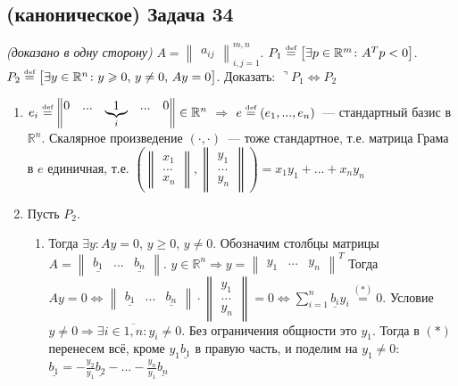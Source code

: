 \documentclass[a4paper]{article}
\def\eqdef{\overset{\mbox{\tiny def}}{=}}
\newcommand{\RR}{\mathbb{R}}
\begin{document}
\subsection*{(каноническое) Задача 34}
{\em (доказано в одну сторону)}\newline
$A=\begin{Vmatrix}
a_{ij}
\end{Vmatrix}_{i,j=1}^{m,n}$. $P_1\eqdef\big[\exists p\in\RR^m\colon A^Tp<0\big]$. $P_2\eqdef\big[\exists y\in\RR^n\colon y\geqslant 0,\,y\neq 0,\,Ay=0\big]$. Доказать: $\urcorner P_1\Leftrightarrow P_2$\begin{enumerate}
\item $e_i\eqdef \begin{Vmatrix}
0 & ... & \underbrace{1}_{i} & ... & 0
\end{Vmatrix}\in\RR^n$ $\Rightarrow$ $e\eqdef(e_1,...,e_n)$~--- стандартный базис в $\RR^n$. Скалярное произведение $(\cdot,\cdot)$~--- тоже стандартное, т.е. матрица Грама в $e$ единичная, т.е. $(\begin{Vmatrix}
x_1\\
...\\
x_n
\end{Vmatrix},
\begin{Vmatrix}
y_1\\
...\\
y_n
\end{Vmatrix})=x_1y_1+...+x_ny_n$
\item Пусть $P_2$. \begin{enumerate}
\item Тогда $\exists y\colon Ay=0$, $y\geqslant 0$, $y\neq 0$. Обозначим столбцы матрицы $A=\begin{Vmatrix}
\underline{b_1} & ... & \underline{b_n}
\end{Vmatrix}$. $y\in\RR^n\Rightarrow y=\begin{Vmatrix}
y_1 & ... & y_n
\end{Vmatrix}^T$ Тогда $Ay=0\Leftrightarrow\begin{Vmatrix}
\underline{b_1} & ... & \underline{b_n}
\end{Vmatrix}\cdot
\begin{Vmatrix}
y_1\\
...\\
y_n
\end{Vmatrix}
=0\Leftrightarrow \sum\limits_{i=1}^n \underline{b_i}y_i\overset{(*)}{=}0$. Условие $y\neq 0\Rightarrow\exists i\in\overline{1,n}\colon y_i\neq 0$. Без ограничения общности это $y_1$. Тогда в $(*)$ перенесем всё, кроме $y_1\underline{b_1}$ в правую часть, и поделим на $y_1\neq 0$: $\underline{b_1}=-\frac{y_2}{y_1}\underline{b_2}-...-\frac{y_n}{y_1}\underline{b_n}$

\end{enumerate}
\end{enumerate}
\end{document}
